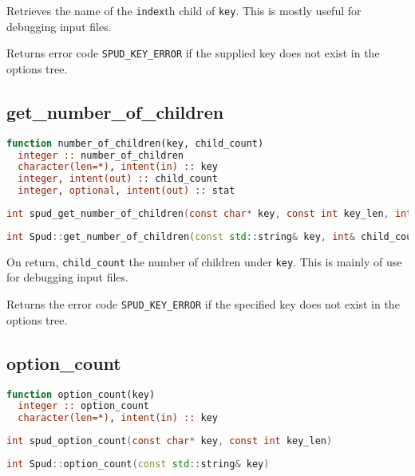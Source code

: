 \documentclass[a4paper, 11pt]{book}
\begin{document}
Retrieves the name of the \lstinline+index+th child of \lstinline+key+. This
is mostly useful for debugging input files.

Returns error code \lstinline+SPUD_KEY_ERROR+ if the supplied key does not
exist in the options tree.

\subsection{get\_number\_of\_children}

\begin{lstlisting}[language=Fortran]
function number_of_children(key, child_count)
  integer :: number_of_children
  character(len=*), intent(in) :: key
  integer, intent(out) :: child_count
  integer, optional, intent(out) :: stat
\end{lstlisting}

\begin{lstlisting}[language=C]
int spud_get_number_of_children(const char* key, const int key_len, int* child_count)
\end{lstlisting}

\begin{lstlisting}[language=C++]
int Spud::get_number_of_children(const std::string& key, int& child_count)
\end{lstlisting}

On return, \lstinline+child_count+  the number of children under \lstinline+key+. This is mainly of use
for debugging input files.

Returns the error code \lstinline+SPUD_KEY_ERROR+ if the specified key does not exist in the options tree.

\subsection{option\_count}

\begin{lstlisting}[language=fortran]
function option_count(key)
  integer :: option_count
  character(len=*), intent(in) :: key
\end{lstlisting}

\begin{lstlisting}[language=C]
int spud_option_count(const char* key, const int key_len)
\end{lstlisting}

\begin{lstlisting}[language=C++]
int Spud::option_count(const std::string& key)
\end{lstlisting}
\end{document}

